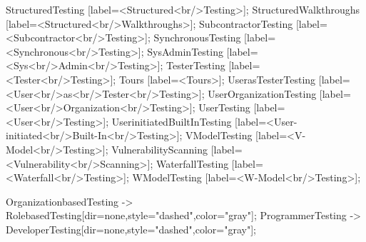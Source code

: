 \documentclass{article}
\begin{document}
{StructuredTesting [label=<Structured<br/>Testing>];
StructuredWalkthroughs [label=<Structured<br/>Walkthroughs>];
SubcontractorTesting [label=<Subcontractor<br/>Testing>];
SynchronousTesting [label=<Synchronous<br/>Testing>];
SysAdminTesting [label=<Sys<br/>Admin<br/>Testing>];
TesterTesting [label=<Tester<br/>Testing>];
Tours [label=<Tours>];
UserasTesterTesting [label=<User<br/>as<br/>Tester<br/>Testing>];
UserOrganizationTesting [label=<User<br/>Organization<br/>Testing>];
UserTesting [label=<User<br/>Testing>];
UserinitiatedBuiltInTesting [label=<User-initiated<br/>Built-In<br/>Testing>];
VModelTesting [label=<V-Model<br/>Testing>];
VulnerabilityScanning [label=<Vulnerability<br/>Scanning>];
WaterfallTesting [label=<Waterfall<br/>Testing>];
WModelTesting [label=<W-Model<br/>Testing>];

OrganizationbasedTesting -> RolebasedTesting[dir=none,style="dashed",color="gray"];
ProgrammerTesting -> DeveloperTesting[dir=none,style="dashed",color="gray"];

}
\end{document}
